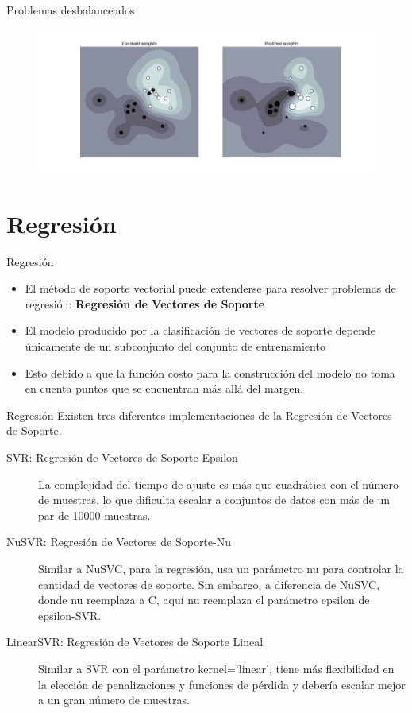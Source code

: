 \documentclass[11pt,aspectratio=169]{beamer}
\begin{document}
\begin{frame}{Problemas desbalanceados}
  \begin{figure}
    \centering
    \includegraphics[scale=0.45]{img/702.png}
  \end{figure}
\end{frame}


\section{Regresión}
\begin{frame}{Regresión}
  \begin{itemize}
    \item El método de soporte vectorial puede extenderse para resolver problemas de regresión\pause: \textbf{Regresión de Vectores de Soporte}\pause
    \item El modelo producido por la clasificación de vectores de soporte depende únicamente de un subconjunto del conjunto de entrenamiento \pause
    \item Esto debido a que la función costo para la construcción del modelo no toma en cuenta puntos que se encuentran más allá del margen. 
  \end{itemize}
\end{frame}

\begin{frame}{Regresión}
  Existen tres diferentes implementaciones de la Regresión de Vectores de Soporte. \pause
  \begin{description}
    \item[SVR: Regresión de Vectores de Soporte-Epsilon] La complejidad del tiempo de ajuste es más que cuadrática con el número de muestras, 
      lo que dificulta escalar a conjuntos de datos con más de un par de 10000 muestras. \pause
    \item[NuSVR: Regresión de Vectores de Soporte-Nu] Similar a NuSVC, para la regresión, usa un parámetro nu para controlar la cantidad de vectores de soporte. Sin embargo, 
      a diferencia de NuSVC, donde nu reemplaza a C, aquí nu reemplaza el parámetro epsilon de epsilon-SVR.\pause
    \item[LinearSVR: Regresión de Vectores de Soporte Lineal] Similar a SVR con el parámetro kernel='linear', tiene más flexibilidad en la elección de penalizaciones y funciones de 
      pérdida y debería escalar mejor a un gran número de muestras.
  \end{description}
\end{frame}
\end{document}
